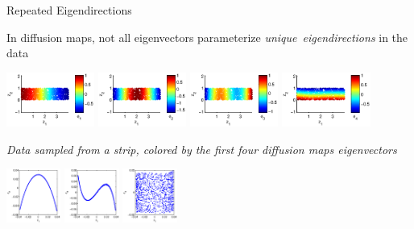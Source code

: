 \documentclass[12pt]{beamer}
\begin{document}
\begin{frame}{Repeated Eigendirections}

\centering

In diffusion maps, not all eigenvectors parameterize {\em unique~eigendirections} in the data


\includegraphics[height=0.7in]{strip_discrete1}
\includegraphics[height=0.7in]{strip_discrete2}
\includegraphics[height=0.7in]{strip_discrete3}
\includegraphics[height=0.7in]{strip_discrete4}

\vspace{-0.1in}
{\em \scriptsize Data sampled from a strip, colored by the first four diffusion maps eigenvectors}

\vspace{0.1in}

\hspace{1.15in}
\includegraphics[height=0.7in]{strip_corr_12}
\hspace{0.3in}
\includegraphics[height=0.7in]{strip_corr_13}
\hspace{0.3in}
\includegraphics[height=0.7in]{strip_corr_14}


\end{frame}
\end{document}
